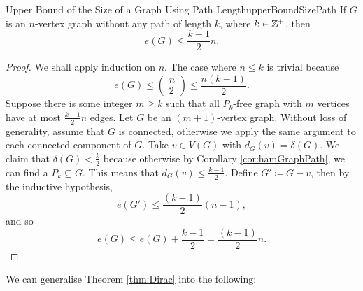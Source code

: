 \documentclass[math]{amznotes}
\theoremstyle{remark}
\newcommand{\0}{\mathbf{0}}
\newcommand{\1}{\mathbf{1}}
\begin{document}
\begin{corbox}{Upper Bound of the Size of a Graph Using Path Length}{upperBoundSizePath}
    If $G$ is an $n$-vertex graph without any path of length $k$, where $k \in \mathbb{Z}^+$, then 
    \begin{equation*}
        e(G) \leq \frac{k - 1}{2}n.
    \end{equation*}
    \tcblower
    \begin{proof}
        We shall apply induction on $n$. The case where $n \leq k$ is trivial because
        \begin{equation*}
            e(G) \leq \begin{pmatrix}
                n \\
                2
            \end{pmatrix} \leq \frac{n(k - 1)}{2}.
        \end{equation*}
        Suppose there is some integer $m \geq k$ such that all $P_k$-free graph with $m$ vertices have at most $\frac{k - 1}{2}n$ edges. Let $G$ be an $(m + 1)$-vertex graph. Without loss of generality, assume that $G$ is connected, otherwise we apply the same argument to each connected component of $G$. Take $v \in V(G)$ with $d_G(v) = \delta(G)$. We claim that $\delta(G) < \frac{k}{2}$ because otherwise by Corollary \ref{cor:hamGraphPath}, we can find a $P_k \subseteq G$. This means that $d_G(v) \leq \frac{k - 1}{2}$. Define $G' \coloneqq G - v$, then by the inductive hypothesis, 
        \begin{equation*}
            e(G') \leq \frac{(k - 1)}{2}(n - 1),
        \end{equation*}
        and so 
        \begin{equation*}
            e(G) \leq e(G) + \frac{k - 1}{2} = \frac{(k - 1)}{2}n.
        \end{equation*}
    \end{proof}
\end{corbox}
We can generalise Theorem \ref{thm:Dirac} into the following:
\end{document}
